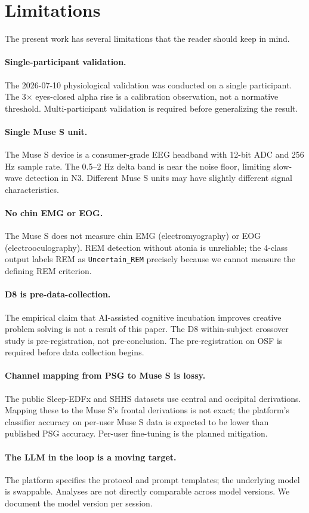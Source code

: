 \section{Limitations}
\label{sec:limitations}

The present work has several limitations that the reader should keep in mind.

\paragraph{Single-participant validation.} The 2026-07-10 physiological validation was conducted on a single participant. The 3$\times$ eyes-closed alpha rise is a calibration observation, not a normative threshold. Multi-participant validation is required before generalizing the result.

\paragraph{Single Muse S unit.} The Muse S device is a consumer-grade EEG headband with 12-bit ADC and 256 Hz sample rate. The 0.5--2 Hz delta band is near the noise floor, limiting slow-wave detection in N3. Different Muse S units may have slightly different signal characteristics.

\paragraph{No chin EMG or EOG.} The Muse S does not measure chin EMG (electromyography) or EOG (electrooculography). REM detection without atonia is unreliable; the 4-class output labels REM as \texttt{Uncertain\_REM} precisely because we cannot measure the defining REM criterion.

\paragraph{D8 is pre-data-collection.} The empirical claim that AI-assisted cognitive incubation improves creative problem solving is not a result of this paper. The D8 within-subject crossover study is pre-registration, not pre-conclusion. The pre-registration on OSF is required before data collection begins.

\paragraph{Channel mapping from PSG to Muse S is lossy.} The public Sleep-EDFx and SHHS datasets use central and occipital derivations. Mapping these to the Muse S's frontal derivations is not exact; the platform's classifier accuracy on per-user Muse S data is expected to be lower than published PSG accuracy. Per-user fine-tuning is the planned mitigation.

\paragraph{The LLM in the loop is a moving target.} The platform specifies the protocol and prompt templates; the underlying model is swappable. Analyses are not directly comparable across model versions. We document the model version per session.
